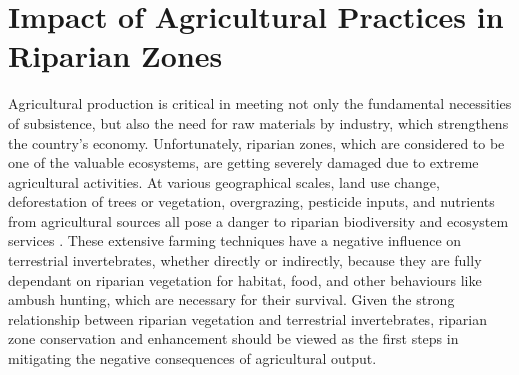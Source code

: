 \documentclass[12pt,a4wide]{report}
\numberwithin{equation}{chapter}
\numberwithin{theorem}{chapter}
\begin{document}
\section{Impact of Agricultural Practices in Riparian Zones}
Agricultural production is critical in meeting not only the fundamental necessities of subsistence, but also the need for raw materials by industry, which strengthens the country's economy. Unfortunately, riparian zones, which are considered to be one of the valuable ecosystems, are getting severely damaged due to extreme agricultural activities. At various geographical scales, land use change, deforestation of trees or vegetation, overgrazing, pesticide inputs, and nutrients from agricultural sources all pose a danger to riparian biodiversity and ecosystem services \cite{burdon2013habitat}. These extensive farming techniques have a negative influence on terrestrial invertebrates, whether directly or indirectly, because they are fully dependant on riparian vegetation for habitat, food, and other behaviours like ambush hunting, which are necessary for their survival. Given the strong relationship between riparian vegetation and terrestrial invertebrates, riparian zone conservation and enhancement should be viewed as the first steps in mitigating the negative consequences of agricultural output.\\
 
\end{document}
